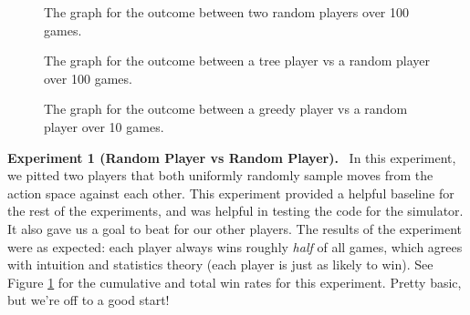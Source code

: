 \documentclass{paper}
\newcommand{\inlineSection}[1]{\vspace{0.5em}\noindent\textbf{#1.}~}
\begin{document}
\begin{figure}[p]
    \centering
     \caption{The graph for the outcome between two random players over 100 games.}
     \label{fig:exp1}
\end{figure}
\begin{figure}[p]
    \centering
     \caption{The graph for the outcome between a tree player vs a random player over 100 games.}
     \label{fig:exp2}
\end{figure}
\begin{figure}[p]
    \centering
     \caption{The graph for the outcome between a greedy player vs a random player over 10 games.}
     \label{fig:exp3}
\end{figure}

\inlineSection{Experiment 1 (Random Player vs Random Player)} In this experiment, we pitted two players that both uniformly randomly sample moves from the action space against each other. This experiment provided a helpful baseline for the rest of the experiments, and was helpful in testing the code for the simulator. It also gave us a goal to beat for our other players. The results of the experiment were as expected: each player always wins roughly \textit{half} of all games, which agrees with intuition and statistics theory (each player is just as likely to win). See Figure \ref{fig:exp1} for the cumulative and total win rates for this experiment. Pretty basic, but we're off to a good start! 
\end{document}

